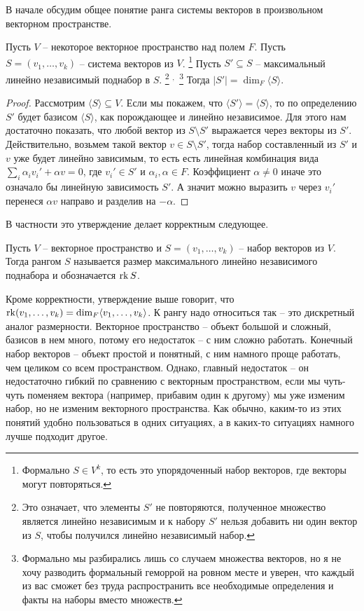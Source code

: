 В начале обсудим общее понятие ранга системы векторов в произвольном векторном пространстве.

\begin{claim}
Пусть $V$ -- некоторое векторное пространство над полем $F$.
Пусть $S = (v_1,\ldots,v_k) $ -- система векторов из $V$.%
\footnote{Формально $S\in V^k$, то есть это упорядоченный набор векторов, где векторы могут повторяться.}
Пусть $S'\subseteq S$ -- максимальный линейно независимый поднабор в $S$.%
\footnote{Это означает, что элементы $S'$ не повторяются, полученное множество является линейно независимым и к набору $S'$ нельзя добавить ни один вектор из $S$, чтобы получился линейно независимый набор.}%
${}^{,\,}$%
\footnote{Формально мы разбирались лишь со случаем множества векторов, но я не хочу разводить формальный геморрой на ровном месте и уверен, что каждый из вас сможет без труда распространить все необходимые определения и факты на наборы вместо множеств.}
Тогда $|S'| = \dim_F \langle S\rangle$.
\end{claim}
\begin{proof}
Рассмотрим $\langle S \rangle\subseteq V$.
Если мы покажем, что $\langle S' \rangle = \langle S \rangle$, то по определению $S'$ будет базисом $\langle S\rangle$, как порождающее и линейно независимое.
Для этого нам достаточно показать, что любой вектор из $S\setminus S'$ выражается через векторы из $S'$.
Действительно, возьмем такой вектор $v\in S\setminus S'$, тогда набор составленный из $S'$ и $v$ уже будет линейно зависимым, то есть есть линейная комбинация вида $\sum_i\alpha_i v_i' + \alpha v = 0$, где  $v_i'\in S'$ и $\alpha_i,\alpha\in F$.
Коэффициент $\alpha\neq 0$ иначе это означало бы линейную зависимость $S'$.
А значит можно выразить $v$ через $v_i'$ перенеся $\alpha v $ направо и разделив на $-\alpha$.
\end{proof}

В частности это утверждение делает корректным следующее.

\begin{definition}
Пусть $V$ -- векторное пространство и $S = (v_1,\ldots,v_k)$ -- набор векторов из $V$.
Тогда рангом $S$ называется размер максимального линейно независимого поднабора и обозначается $\operatorname{rk} S$.
\end{definition}

Кроме корректности, утверждение выше говорит, что $\operatorname{rk} (v_1,\ldots,v_k) = \dim_F \langle v_1, \ldots,v_k\rangle$.
К рангу надо относиться так -- это дискретный аналог размерности.
Векторное пространство -- объект большой и сложный, базисов в нем много, потому его недостаток -- с ним сложно работать.
Конечный набор векторов -- объект простой и понятный, с ним намного проще работать, чем целиком со всем пространством.
Однако, главный недостаток -- он недостаточно гибкий по сравнению с векторным пространством, если мы чуть-чуть поменяем вектора (например, прибавим один к другому) мы уже изменим набор, но не изменим векторного пространства.
Как обычно, каким-то из этих понятий удобно пользоваться в одних ситуациях, а в каких-то ситуациях намного лучше подходит другое.


